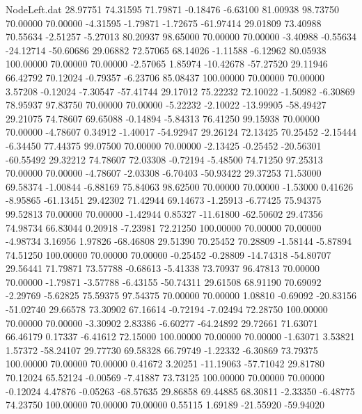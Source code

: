 \begin{filecontents}{NodeLeft.dat}
  28.97751   74.31595   71.79871    -0.18476   -6.63100   81.00938   98.73750   70.00000   70.00000   -4.31595   -1.79871   -1.72675  -61.97414
  29.01809   73.40988   70.55634    -2.51257   -5.27013   80.20937   98.65000   70.00000   70.00000   -3.40988   -0.55634  -24.12714  -50.60686
  29.06882   72.57065   68.14026    -1.11588   -6.12962   80.05938  100.00000   70.00000   70.00000   -2.57065    1.85974  -10.42678  -57.27520
  29.11946   66.42792   70.12024    -0.79357   -6.23706   85.08437  100.00000   70.00000   70.00000    3.57208   -0.12024   -7.30547  -57.41744
  29.17012   75.22232   72.10022    -1.50982   -6.30869   78.95937   97.83750   70.00000   70.00000   -5.22232   -2.10022  -13.99905  -58.49427
  29.21075   74.78607   69.65088    -0.14894   -5.84313   76.41250   99.15938   70.00000   70.00000   -4.78607    0.34912   -1.40017  -54.92947
  29.26124   72.13425   70.25452    -2.15444   -6.34450   77.44375   99.07500   70.00000   70.00000   -2.13425   -0.25452  -20.56301  -60.55492
  29.32212   74.78607   72.03308    -0.72194   -5.48500   74.71250   97.25313   70.00000   70.00000   -4.78607   -2.03308   -6.70403  -50.93422
  29.37253   71.53000   69.58374    -1.00844   -6.88169   75.84063   98.62500   70.00000   70.00000   -1.53000    0.41626   -8.95865  -61.13451
  29.42302   71.42944   69.14673    -1.25913   -6.77425   75.94375   99.52813   70.00000   70.00000   -1.42944    0.85327  -11.61800  -62.50602
  29.47356   74.98734   66.83044     0.20918   -7.23981   72.21250  100.00000   70.00000   70.00000   -4.98734    3.16956    1.97826  -68.46808
  29.51390   70.25452   70.28809    -1.58144   -5.87894   74.51250  100.00000   70.00000   70.00000   -0.25452   -0.28809  -14.74318  -54.80707
  29.56441   71.79871   73.57788    -0.68613   -5.41338   73.70937   96.47813   70.00000   70.00000   -1.79871   -3.57788   -6.43155  -50.74311
  29.61508   68.91190   70.69092    -2.29769   -5.62825   75.59375   97.54375   70.00000   70.00000    1.08810   -0.69092  -20.83156  -51.02740
  29.66578   73.30902   67.16614    -0.72194   -7.02494   72.28750  100.00000   70.00000   70.00000   -3.30902    2.83386   -6.60277  -64.24892
  29.72661   71.63071   66.46179     0.17337   -6.41612   72.15000  100.00000   70.00000   70.00000   -1.63071    3.53821    1.57372  -58.24107
  29.77730   69.58328   66.79749    -1.22332   -6.30869   73.79375  100.00000   70.00000   70.00000    0.41672    3.20251  -11.19063  -57.71042
  29.81780   70.12024   65.52124    -0.00569   -7.41887   73.73125  100.00000   70.00000   70.00000   -0.12024    4.47876   -0.05263  -68.57635
  29.86858   69.44885   68.30811    -2.33350   -6.48775   74.23750  100.00000   70.00000   70.00000    0.55115    1.69189  -21.55920  -59.94020

\end{filecontents}

